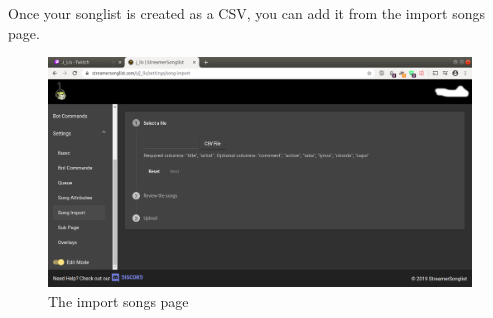 Once your songlist is created as a CSV, you can add it from the import songs page.

\begin{figure}[h!]
  \includegraphics[width=\linewidth]{src/songlist_import/import_songs.png}
  \caption{The import songs page}
  \label{import songs}
\end{figure}
